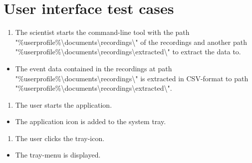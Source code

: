 \section{User interface test cases}

\begin{tests}
    {\begin{enumerate}
        \item The \gls{scientist} starts the command-line tool with the path "\%userprofile\%\textbackslash documents\textbackslash recordings\textbackslash" of the recordings and another path "\%userprofile\%\textbackslash documents\textbackslash recordings\textbackslash extracted\textbackslash" to extract the data to.
    \end{enumerate}}
    {\begin{itemize}
        \item The \gls{event} data contained in the recordings at path "\%userprofile\%\textbackslash documents\textbackslash recordings\textbackslash" is extracted in CSV-format to path "\%userprofile\%\textbackslash documents\textbackslash recordings\textbackslash extracted\textbackslash".
    \end{itemize}}

    {\begin{enumerate}
        \item The \gls{user} starts the application.
    \end{enumerate}}
    {\begin{itemize}
        \item The application icon is added to the system tray.
    \end{itemize}}

    {\begin{enumerate}
        \item The \gls{user} clicks the tray-icon.
    \end{enumerate}}
    {\begin{itemize}
        \item The tray-menu is displayed.
    \end{itemize}}
\end{tests}

